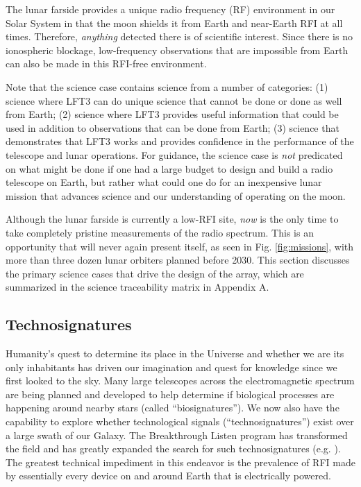 The lunar farside provides a unique radio frequency (RF) environment in our Solar System in that the moon shields it from Earth and near-Earth RFI at all times. Therefore, {\em anything} detected there is of scientific interest. Since there is no ionospheric blockage, low-frequency observations that are impossible from Earth can also be made in this RFI-free environment.

Note that the science case contains science from a number of categories:
(1) science where LFT3 can do unique science that cannot be done or done as well from Earth;
(2) science where LFT3 provides useful information that could be used in addition to observations that can be done from Earth;
(3) science that demonstrates that LFT3 works and provides confidence in the performance of the telescope and lunar operations.  For guidance, the science case is {\em not} predicated on what might be done if one had a large budget to design and build a radio telescope on Earth, but rather what could one do for an inexpensive lunar mission that advances science and our understanding of operating on the moon.

Although the lunar farside is currently a low-RFI site, {\em now} is the only time to take completely pristine measurements of the radio spectrum. This is an opportunity that will never again present itself, as seen in Fig. \ref{fig:missions}, with more than three dozen lunar orbiters planned before 2030.  This section discusses the primary science cases that drive the design of the array, which are summarized in the science traceability matrix in Appendix A.

\subsection{Technosignatures}
Humanity's quest to determine its place in the Universe and whether we are its only inhabitants has driven our imagination and quest for knowledge since we first looked to the sky.  Many large telescopes across the electromagnetic spectrum are being planned and developed to help determine if biological processes are happening around nearby stars (called ``biosignatures'').  We now also have the capability to explore whether technological signals (``technosignatures'') exist over a large swath of our Galaxy.  The Breakthrough Listen program \citep{2016iac..conf34378W} has transformed the field and has greatly expanded the search for such technosignatures (e.g. \citealt{Enriquez_2017, Price_2020, Gajjar_2021}).  The greatest technical impediment in this endeavor is the prevalence of RFI made by essentially every device on and around Earth that is electrically powered.

